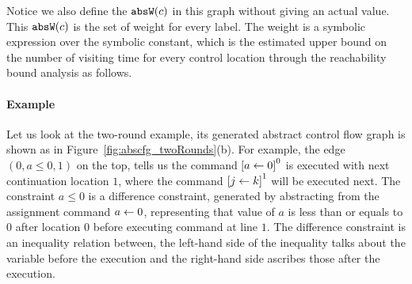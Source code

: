 Notice we also define the $\mathtt{abs}{\mathtt{W}}(c)$ in this graph without giving an actual value.
This $\mathtt{abs}{\mathtt{W}}(c)$ is the set of weight for every 
label. The weight is a symbolic expression over the symbolic constant, 
which is the estimated upper bound on the number of visiting time for every control location
through the reachability bound analysis as follows.
%
%
\paragraph*{Example}
%
Let us look at the two-round example, its generated abstract control flow graph is shown as in Figure~\ref{fig:abscfg_twoRounds}(b).
For example, the edge $(0, a \leq 0, 1)$ on the top, tells us the command 
$\clabel{\assign{a}{0}}^0$ is executed with next continuation location $1$,
where the 
command $\clabel{\assign{j}{k}}^1$ will be executed next.
The constraint $a \leq 0$ is a difference constraint, generated by abstracting from the assignment command $\mathrel{ a \leftarrow 0 }$,
representing that value of $a$ is less than or equals to $0$ after 
location $0$ before executing command at line $1$. The difference constraint is an inequality relation between, the left-hand side of the inequality talks about the variable before the execution and the right-hand side ascribes those after the execution. 

